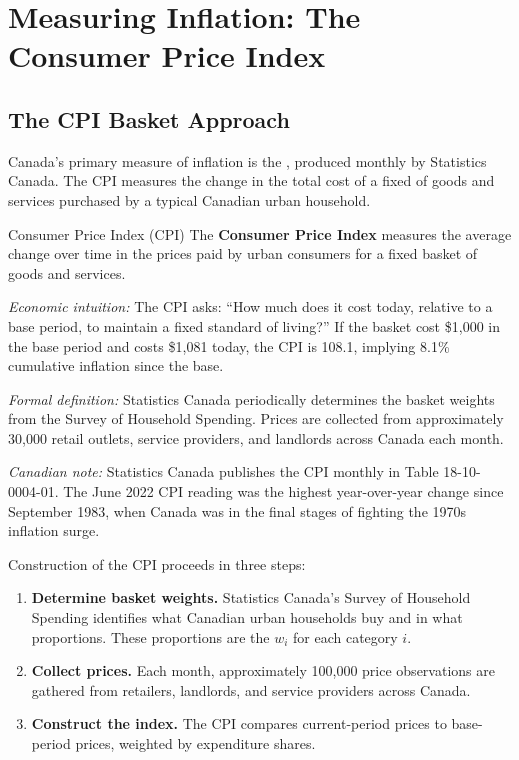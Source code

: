 \section{Measuring Inflation: The Consumer Price Index}
\label{sec:cpi_measurement}

\subsection{The CPI Basket Approach}

Canada's primary measure of inflation is the ,
produced monthly by Statistics Canada. The CPI measures the change in the
total cost of a fixed  of goods and services
purchased by a typical Canadian urban household.

\begin{defbox}{Consumer Price Index (CPI)}
The \textbf{Consumer Price Index} measures the average change over time
in the prices paid by urban consumers for a fixed basket of goods and
services.

\textit{Economic intuition:} The CPI asks: ``How much does it cost today,
relative to a base period, to maintain a fixed standard of living?''
If the basket cost \$1{,}000 in the base period and costs \$1{,}081 today,
the CPI is 108.1, implying 8.1\% cumulative inflation since the base.

\textit{Formal definition:} Statistics Canada periodically determines the
basket weights from the Survey of Household Spending. Prices are collected
from approximately 30{,}000 retail outlets, service providers, and
landlords across Canada each month.

\textit{Canadian note:} Statistics Canada publishes the CPI monthly in
Table 18-10-0004-01. The June 2022 CPI reading was the highest year-over-year
change since September 1983, when Canada was in the final stages of
fighting the 1970s inflation surge.
\end{defbox}

Construction of the CPI proceeds in three steps:

\begin{enumerate}
  \item \textbf{Determine basket weights.} Statistics Canada's Survey of
        Household Spending identifies what Canadian urban households buy
        and in what proportions. These proportions are the
         $w_i$ for each category $i$.
  \item \textbf{Collect prices.} Each month, approximately 100{,}000 price
        observations are gathered from retailers, landlords, and service
        providers across Canada.
  \item \textbf{Construct the index.} The CPI compares current-period prices
        to base-period prices, weighted by expenditure shares.
\end{enumerate}

